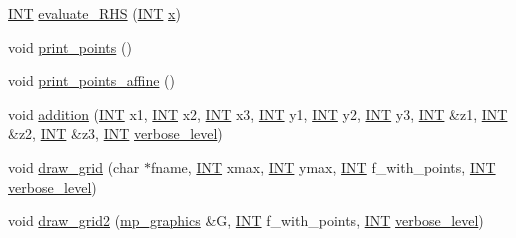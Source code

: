 \begin{DoxyCompactItemize}
\item 
\mbox{\hyperlink{galois_8h_a09fddde158a3a20bd2dcadb609de11dc}{I\+NT}} \mbox{\hyperlink{classelliptic__curve_a786cd8da18139b9b01f285f030916f2d}{evaluate\+\_\+\+R\+HS}} (\mbox{\hyperlink{galois_8h_a09fddde158a3a20bd2dcadb609de11dc}{I\+NT}} \mbox{\hyperlink{alphabet2_8_c_a6150e0515f7202e2fb518f7206ed97dc}{x}})
\item 
void \mbox{\hyperlink{classelliptic__curve_a20722db9691dc742ba191cad745a2821}{print\+\_\+points}} ()
\item 
void \mbox{\hyperlink{classelliptic__curve_a13b3d332ae835291810049d19cf10c85}{print\+\_\+points\+\_\+affine}} ()
\item 
void \mbox{\hyperlink{classelliptic__curve_af927b0ba3e6d959598f9d372ec7315c2}{addition}} (\mbox{\hyperlink{galois_8h_a09fddde158a3a20bd2dcadb609de11dc}{I\+NT}} x1, \mbox{\hyperlink{galois_8h_a09fddde158a3a20bd2dcadb609de11dc}{I\+NT}} x2, \mbox{\hyperlink{galois_8h_a09fddde158a3a20bd2dcadb609de11dc}{I\+NT}} x3, \mbox{\hyperlink{galois_8h_a09fddde158a3a20bd2dcadb609de11dc}{I\+NT}} y1, \mbox{\hyperlink{galois_8h_a09fddde158a3a20bd2dcadb609de11dc}{I\+NT}} y2, \mbox{\hyperlink{galois_8h_a09fddde158a3a20bd2dcadb609de11dc}{I\+NT}} y3, \mbox{\hyperlink{galois_8h_a09fddde158a3a20bd2dcadb609de11dc}{I\+NT}} \&z1, \mbox{\hyperlink{galois_8h_a09fddde158a3a20bd2dcadb609de11dc}{I\+NT}} \&z2, \mbox{\hyperlink{galois_8h_a09fddde158a3a20bd2dcadb609de11dc}{I\+NT}} \&z3, \mbox{\hyperlink{galois_8h_a09fddde158a3a20bd2dcadb609de11dc}{I\+NT}} \mbox{\hyperlink{simeon_8_c_a818073fbcc2f439e7c56952f67386122}{verbose\+\_\+level}})
\item 
void \mbox{\hyperlink{classelliptic__curve_afa9d40e1a626257ad802bdb5a157ad0a}{draw\+\_\+grid}} (char $\ast$fname, \mbox{\hyperlink{galois_8h_a09fddde158a3a20bd2dcadb609de11dc}{I\+NT}} xmax, \mbox{\hyperlink{galois_8h_a09fddde158a3a20bd2dcadb609de11dc}{I\+NT}} ymax, \mbox{\hyperlink{galois_8h_a09fddde158a3a20bd2dcadb609de11dc}{I\+NT}} f\+\_\+with\+\_\+points, \mbox{\hyperlink{galois_8h_a09fddde158a3a20bd2dcadb609de11dc}{I\+NT}} \mbox{\hyperlink{simeon_8_c_a818073fbcc2f439e7c56952f67386122}{verbose\+\_\+level}})
\item 
void \mbox{\hyperlink{classelliptic__curve_a20f858541aed9bfaabdf69b10f18cdbe}{draw\+\_\+grid2}} (\mbox{\hyperlink{classmp__graphics}{mp\+\_\+graphics}} \&G, \mbox{\hyperlink{galois_8h_a09fddde158a3a20bd2dcadb609de11dc}{I\+NT}} f\+\_\+with\+\_\+points, \mbox{\hyperlink{galois_8h_a09fddde158a3a20bd2dcadb609de11dc}{I\+NT}} \mbox{\hyperlink{simeon_8_c_a818073fbcc2f439e7c56952f67386122}{verbose\+\_\+level}})

\end{DoxyCompactItemize}
